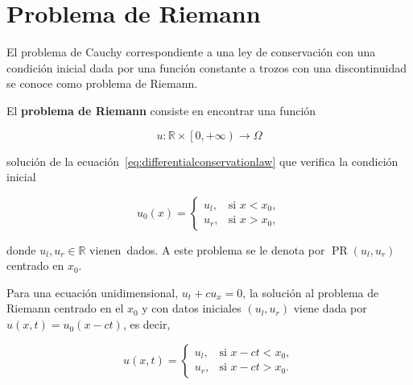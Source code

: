 \section{Problema de Riemann}

El problema de Cauchy correspondiente a una ley de conservación con
una condición inicial dada por una función constante a trozos con una
discontinuidad se conoce como problema de Riemann.

\begin{definition}
  El \textbf{problema de Riemann} consiste en encontrar una función

  \begin{equation*}
    u\colon\mathbb{R}\times
    \left[0,+\infty\right)\longrightarrow
    \Omega
  \end{equation*}

  solución de la ecuación~\eqref{eq:differentialconservationlaw} que
  verifica la condición inicial

  \begin{equation}\label{eq:initialconditionriemann}
    u_{0}\left(x\right)=
    \begin{cases}
      u_{l}, &
      \text{si } x<x_{0}, \\
      u_{r}, &
      \text{si } x>x_{0},
    \end{cases}
  \end{equation}

  donde $u_{l},u_{r}\in\mathbb{R}$ vienen~dados.
  A este problema se le denota por
  $\operatorname{PR}\left(u_{l},u_{r}\right)$ centrado en $x_{0}$.
\end{definition}

Para una ecuación unidimensional, $u_{t}+cu_{x}=0$, la solución al
problema de Riemann centrado en el $x_{0}$ y con datos iniciales
$\left(u_{l},u_{r}\right)$ viene dada por
$u\left(x,t\right)=u_{0}\left(x-ct\right)$, es decir,

\begin{equation}\label{eq:solutionriemann}
  u
  \left(x,t\right)=
  \begin{cases}
    u_{l}, &
    \text{si } x-ct<x_{0}, \\
    u_{r}, &
    \text{si } x-ct>x_{0}.
  \end{cases}
\end{equation}
